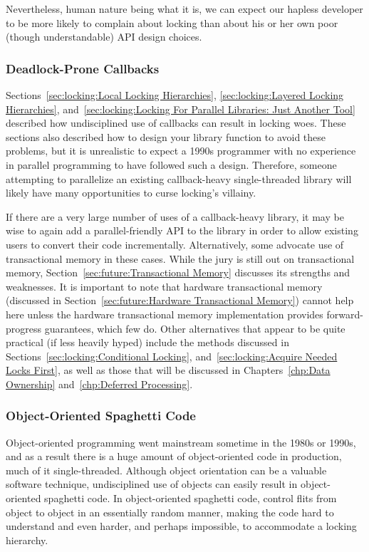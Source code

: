 Nevertheless, human nature being what it is, we can expect our hapless
developer to be more likely to complain about locking than about his
or her own poor (though understandable) API design choices.

\subsubsection{Deadlock-Prone Callbacks}
\label{sec:locking:Deadlock-Prone Callbacks}

Sections~\ref{sec:locking:Local Locking Hierarchies},
\ref{sec:locking:Layered Locking Hierarchies},
and~\ref{sec:locking:Locking For Parallel Libraries: Just Another Tool}
described how undisciplined use of callbacks can result in locking
woes.
These sections also described how to design your library function to
avoid these problems, but it is unrealistic to expect a 1990s programmer
with no experience in parallel programming to have followed such a design.
Therefore, someone attempting to parallelize an existing callback-heavy
single-threaded library will likely have many opportunities to curse
locking's villainy.

If there are a very large number of uses of a callback-heavy library,
it may be wise to again add a parallel-friendly API to the library in
order to allow existing users to convert their code incrementally.
Alternatively, some advocate use of transactional memory in these cases.
While the jury is still out on transactional memory,
Section~\ref{sec:future:Transactional Memory} discusses its strengths and
weaknesses.
It is important to note that hardware transactional memory
(discussed in
Section~\ref{sec:future:Hardware Transactional Memory})
cannot help here unless the hardware transactional memory implementation
provides forward-progress guarantees, which few do.
Other alternatives that appear to be quite practical (if less heavily
hyped) include the methods discussed in
Sections~\ref{sec:locking:Conditional Locking},
and~\ref{sec:locking:Acquire Needed Locks First},
as well as those that will be discussed in
Chapters~\ref{chp:Data Ownership}
and~\ref{chp:Deferred Processing}.

\subsubsection{Object-Oriented Spaghetti Code}
\label{sec:locking:Object-Oriented Spaghetti Code}

Object-oriented programming went mainstream sometime in the 1980s or
1990s, and as a result there is a huge amount of object-oriented code
in production, much of it single-threaded.
Although object orientation can be a valuable software technique,
undisciplined use of objects can easily result in object-oriented
spaghetti code.
In object-oriented spaghetti code, control flits from object to object
in an essentially random manner, making the code hard to understand
and even harder, and perhaps impossible, to accommodate a locking hierarchy.

